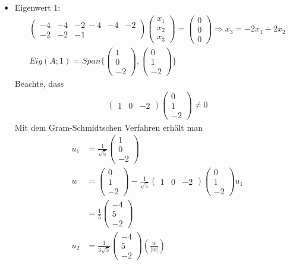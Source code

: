 \begin{itemize}
\item \f{Eigenwert 1}: 
\begin{align}
\begin{pmatrix} -4 & -4 & -2 \ -4 & -4 & -2 \\ -2 & -2 & -1 \end{pmatrix} \begin{pmatrix} x_1 \\ x_2 \\ x_3 \end{pmatrix} = \begin{pmatrix} 0 \\ 0 \\ 0 \end{pmatrix} \Rightarrow x_3 = -2x_1 - 2x_2 \\
Eig(A; 1) = Span \{\begin{pmatrix} 1 \\ 0 \\ -2\end{pmatrix}, \begin{pmatrix} 0 \\ 1 \\ -2 \end{pmatrix}\}
\end{align}
Beachte, dass
\begin{align}
\begin{pmatrix} 1 & 0 & -2\end{pmatrix} \begin{pmatrix} 0 \\ 1 \\ -2 \end{pmatrix} \neq 0
\end{align}
Mit dem Gram-Schmidtschen Verfahren erhält man
\begin{align}
u_1 &= \frac{1}{\sqrt{5}} \begin{pmatrix} 1 \\ 0 \\ -2\end{pmatrix} \\
w &= \begin{pmatrix} 0 \\ 1 \\ -2 \end{pmatrix} - \frac{1}{\sqrt{5}} \begin{pmatrix} 1 & 0 & -2\end{pmatrix} \begin{pmatrix} 0 \\ 1 \\ -2 \end{pmatrix} u_1 \\
&= \frac{1}{5} \begin{pmatrix} -4 \\ 5 \\ -2 \end{pmatrix} \\
u_2 &= \frac{1}{3\sqrt{5}} \begin{pmatrix} -4 \\ 5 \\ -2\end{pmatrix} \left( \frac{w}{|w|}\right)
\end{align}


\end{itemize}
